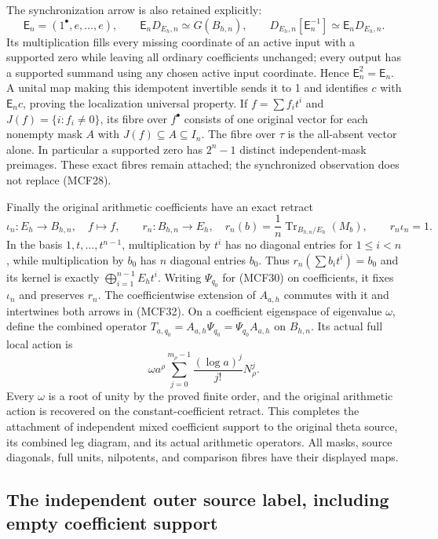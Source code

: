 The synchronization arrow is also retained explicitly:
\[
\mathsf E_n=(1^\bullet,e,\ldots,e),\qquad
\mathsf E_nD_{E_h,n}\simeq G(B_{h,n}),\qquad
D_{E_h,n}[\mathsf E_n^{-1}]\simeq\mathsf E_nD_{E_h,n}.
\tag{MCF31}
\]
Its multiplication fills every missing coordinate of an active input
with a supported zero while leaving all ordinary coefficients unchanged;
every output has a supported summand using any chosen active input
coordinate.  Hence $\mathsf E_n^2=\mathsf E_n$.  A unital map making
this idempotent invertible sends it to 1 and identifies $c$ with
$\mathsf E_nc$, proving the localization universal property.
If $f=\sum f_it^i$ and $J(f)=\{i:f_i\ne0\}$, its fibre over
$f^\bullet$ consists of one original vector for each nonempty mask
$A$ with $J(f)\subseteq A\subseteq I_n$.  The fibre over $\tau$ is
the all-absent vector alone.  In particular a supported zero has
$2^n-1$ distinct independent-mask preimages.  These exact fibres remain
attached; the synchronized observation does not replace (MCF28).

Finally the original arithmetic coefficients have an exact retract
\[
\iota_n:E_h\longrightarrow B_{h,n},\quad f\mapsto f,
\qquad r_n:B_{h,n}\longrightarrow E_h,
\quad r_n(b)=\frac1n\operatorname{Tr}_{B_{h,n}/E_h}(M_b),
\qquad r_n\iota_n=1.
\tag{MCF32}
\]
In the basis $1,t,\ldots,t^{n-1}$, multiplication by $t^i$ has no
diagonal entries for $1\leq i<n$, while multiplication by $b_0$
has $n$ diagonal entries $b_0$.  Thus $r_n(\sum b_it^i)=b_0$ and
its kernel is exactly $\bigoplus_{i=1}^{n-1}E_ht^i$.
Writing $\Psi_{q_0}$ for (MCF30) on coefficients, it fixes $\iota_n$
and preserves $r_n$.  The coefficientwise extension of $A_{a,h}$
commutes with it and intertwines both arrows in (MCF32).  On a coefficient
eigenspace of eigenvalue $\omega$, define the combined operator
$T_{a,q_0}=A_{a,h}\Psi_{q_0}=\Psi_{q_0}A_{a,h}$ on $B_{h,n}$.
Its actual full local action is
\[
\omega a^\rho\sum_{j=0}^{m_\rho-1}
          \frac{(\log a)^j}{j!}N_\rho^j.
\tag{MCF33}
\]
Every $\omega$ is a root of unity by the proved finite order, and the
original arithmetic action is recovered on the constant-coefficient
retract.  This completes the attachment of independent mixed coefficient
support to the original theta source, its combined leg diagram, and its
actual arithmetic operators.  All masks, source diagonals, full units,
nilpotents, and comparison fibres have their displayed maps.

\subsection{The independent outer source label, including empty coefficient support}

